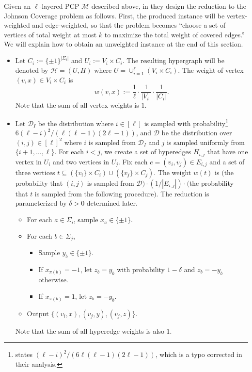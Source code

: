 \documentclass[10pt,a4paper]{amsart}
\newcommand{\calm}{\mathcal{M}}
\newcommand{\calh}{\mathcal{H}}
\newcommand{\cald}{\mathcal{D}}
\begin{document}
Given an $\ell$-layered PCP $\calm$ described above, in \cite{Cohen-AddadSL22} they design the reduction to the Johnson Coverage problem as follows.
First, the produced instance will be vertex-weighted and edge-weighted, so that the problem becomes ``choose a set of vertices of total weight at most $k$ to maximize the total weight of covered edges.'' We will explain how to obtain an unweighted instance at the end of this section. 


\begin{itemize}
\item Let $C_i := \{ \pm 1 \}^{|\Sigma_i|}$ and $U_i := V_i \times C_i$. 
The resulting hypergraph will be denoted by $\calh = (U, H)$ where $U = \cup_{i=1}^{\ell} (V_i \times C_i)$. The weight of vertex $(v, x) \in V_i \times C_i$ is 
\[
w(v, x) :=\frac{1}{\ell} \cdot \frac{1}{|V_i|} \cdot \frac{1}{|C_i|}.
\]
Note that the sum of all vertex weights is $1$. 

\item Let $\cald_I$ be the distribution where $i \in [\ell]$ is sampled with probability\footnote{\cite{Cohen-AddadSL22} states $(\ell-i)^2 / (6\ell(\ell - 1)(2\ell - 1))$, which is a typo corrected in their analysis.} $6(\ell-i)^2 / (\ell(\ell - 1)(2\ell - 1))$, and $\cald$ be the distribution over $(i, j) \in [\ell]^2$ where $i$ is sampled from $\cald_I$ and $j$ is sampled uniformly from $\{ i+1, \dots, \ell \}$. For each $i < j$, we create a set of hyperedges $H_{i,j}$ that have one vertex in $U_i$ and two vertices in $U_j$. 
Fix each $e = (v_i, v_j) \in E_{i,j}$ and a set of three vertices $t \subseteq (\{ v_i \} \times C_i) \cup (\{ v_j \} \times C_j)$. The weight $w(t)$ is $($the probability that $(i, j)$ is sampled from $\cald) \cdot (1/|E_{i,j}|) \cdot ($the probability that $t$ is sampled from the following procedure$)$. The reduction is parameterized by $\delta > 0$ determined later. 
\begin{itemize}
\item For each $a \in \Sigma_i$, sample $x_a \in \{ \pm 1 \}$.
\item For each $b \in \Sigma_j$, 
\begin{itemize}
\item Sample $y_b \in \{ \pm 1 \}$. 
\item If $x_{\pi(b)} = -1$, let $z_b = y_b$ with probability $1-\delta$ and $z_b = -y_b$ otherwise.
\item If $x_{\pi(b)} = 1$, let $z_b = -y_b$. 
\end{itemize}
\item Output $\{ (v_i, x), (v_j, y), (v_j, z) \}$. 
\end{itemize}
Note that the sum of all hyperedge weights is also $1$. 
\end{itemize}
\end{document}
